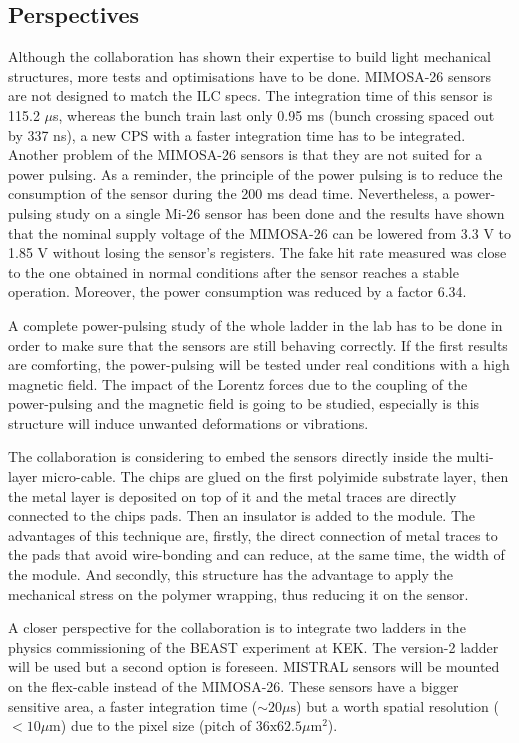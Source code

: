     \subsection{Perspectives}

    Although the collaboration has shown their expertise to build light mechanical structures, more tests and optimisations have to be done.
    MIMOSA-26 sensors are not designed to match the \gls{ILC} specs. 
    The integration time of this sensor is 115.2 $\mu$s, whereas the bunch train last only 0.95 ms (bunch crossing spaced out by 337 ns), a new CPS with a faster integration time has to be integrated.
    Another problem of the MIMOSA-26 sensors is that they are not suited for a power pulsing. As a reminder, the principle of the power pulsing is to reduce the consumption of the sensor during the 200 ms dead time. 
    Nevertheless, a power-pulsing study on a single Mi-26 sensor has been done and the results have shown that the nominal supply voltage of the MIMOSA-26 can be lowered from 3.3 V to 1.85 V without losing the sensor's registers. 
    The fake hit rate measured was close to the one obtained in  normal conditions after the sensor reaches a stable operation.
    Moreover, the power consumption was reduced by a factor 6.34\cite{Kuprash2013}. 

    A complete power-pulsing study of the whole ladder in the lab has to be done in order to make sure that the sensors are still behaving correctly.
    If the first results are comforting, the power-pulsing will be tested under real conditions with a high magnetic field.
    The impact of the Lorentz forces due to the coupling of the power-pulsing and the magnetic field is going to be studied, especially is this structure will induce unwanted deformations or vibrations. 

    The collaboration is considering to embed the sensors directly inside the multi-layer micro-cable\cite{Baudot2012}.
    The chips are glued on the first polyimide substrate layer, then the metal layer is deposited on top of it and the metal traces are directly connected to the chips pads.
    Then an insulator is added to the module.
    The advantages of this technique are, firstly, the direct connection of metal traces to the pads that avoid wire-bonding and can reduce, at the same time, the width of the module.
    And secondly, this structure has the advantage to apply the mechanical stress on the polymer wrapping, thus reducing it on the sensor.

    A closer perspective for the collaboration is to integrate two ladders in the physics commissioning of the BEAST experiment at KEK.
    The version-2 ladder will be used but a second option is foreseen.
    MISTRAL sensors will be mounted on the flex-cable instead of the MIMOSA-26.
    These sensors have a bigger sensitive area, a faster integration time  ($\sim 20\mu\text{s}$) but a worth spatial resolution ($< 10 \mu\text{m}$) due to the pixel size (pitch of $36 \text{x} 62.5 \mu\text{m}^2$).

